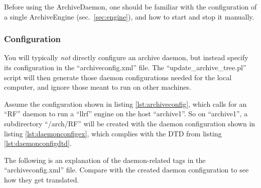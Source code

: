 Before using the ArchiveDaemon, one should be familiar
with the configuration of a single ArchiveEngine (sec.\ \ref{sec:engine}),
and how to start and stop it manually.

\subsubsection{Configuration}
You will typically \emph{not} directly configure an archive daemon,
but instead specify its configuration in the ``archiveconfig.xml''
file. The ``update\_archive\_tree.pl'' script will then generate
those daemon configurations needed for the local computer, and ignore
those meant to run on other machines.

Assume the configuration shown in listing \ref{lst:archiveconfig},
which calls for an ``RF'' daemon to run a ``llrf'' engine on the host
``archive1''. So on ``archive1'', a subdirectory ``/arch/RF'' will be
created with the daemon configuration shown in listing 
\ref{lst:daemonconfigex}, which complies with the DTD from listing
\ref{lst:daemonconfigdtd}.



\noindent The following is an explanation of the daemon-related tags in the
``archiveconfig.xml'' file. Compare with the created daemon
configuration to see how they get translated.

